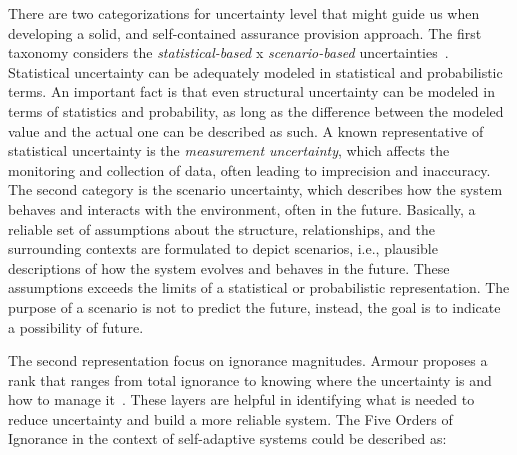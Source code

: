 There are two categorizations for uncertainty level that might guide us when developing a solid, and self-contained assurance provision approach. The first taxonomy considers the \textit{statistical-based}
x \textit{scenario-based} uncertainties~\cite{walker2003defining}. Statistical uncertainty can be adequately modeled in statistical and probabilistic terms. An important fact is that even structural uncertainty can be modeled in terms of statistics and probability, as long as the difference between the modeled value and the actual one can be described as such. A known representative of statistical uncertainty is the \textit{measurement uncertainty}, which affects the monitoring and collection of data, often leading to imprecision and inaccuracy. The second category is the scenario uncertainty, which describes how the system behaves and interacts with the environment, often in the future. Basically, a reliable set of assumptions about the structure, relationships, and the surrounding contexts are formulated to depict scenarios, i.e., plausible descriptions of how the system evolves and behaves in the future. These assumptions exceeds the limits of a statistical or probabilistic representation. The purpose of a scenario is not to predict the future, instead, the goal is to indicate a possibility of future.

The second representation focus on ignorance magnitudes. Armour proposes a rank that ranges from total ignorance to knowing where the uncertainty is and how to manage it~\cite{armour2000five}. These layers are helpful in identifying what is needed to reduce uncertainty 
and build a more reliable system. The Five Orders of Ignorance in the context of self-adaptive systems could be described as:

